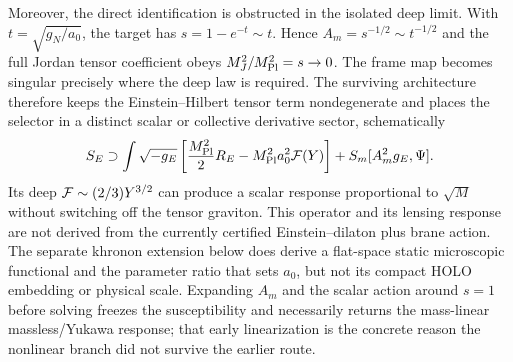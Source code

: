 \documentclass[10pt]{article}
\begin{document}
Moreover, the direct identification is obstructed in the isolated deep
limit.  With $t=\sqrt{g_N/a_0}$, the target has
$s=1-e^{-t}\sim t$.  Hence $A_m=s^{-1/2}\sim t^{-1/2}$ and the full Jordan
tensor coefficient obeys $M_J^2/M_{\rm Pl}^2=s\to0$.  The frame map becomes
singular precisely where the deep law is required.  The surviving
architecture therefore keeps the Einstein--Hilbert tensor term nondegenerate
and places the selector in a distinct scalar or collective derivative sector,
schematically
\begin{equation}
 S_E\supset\int\sqrt{-g_E}\left[
 \frac{M_{\rm Pl}^2}{2}R_E-M_{\rm Pl}^2a_0^2{\cal F}(Y)\right]
 +S_m[A_m^2g_E,\Psi].
 \label{eq:survivingarchitecture}
\end{equation}
Its deep ${\cal F}\sim(2/3)Y^{3/2}$ can produce a scalar response proportional
to $\sqrt M$ without switching off the tensor graviton.  This operator and its
lensing response are not derived from the currently certified
Einstein--dilaton plus brane action.  The separate khronon extension below does
derive a flat-space static microscopic functional and the parameter ratio that
sets $a_0$, but not its compact HOLO embedding or physical scale.  Expanding
$A_m$ and the scalar action around $s=1$ before solving freezes the
susceptibility and necessarily returns the mass-linear massless/Yukawa
response; that early linearization is the concrete reason the nonlinear branch
did not survive the earlier route.
\end{document}
